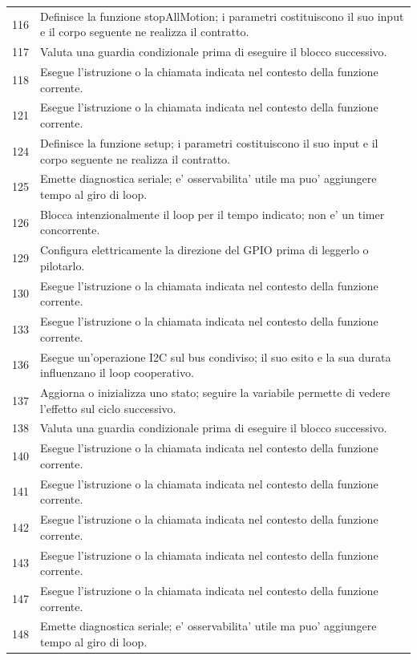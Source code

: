 \documentclass[11pt,a4paper]{article}
\begin{document}
\begin{longtable}{p{}p{}}
116 & Definisce la funzione stopAllMotion; i parametri costituiscono il suo input e il corpo seguente ne realizza il contratto. \\
117 & Valuta una guardia condizionale prima di eseguire il blocco successivo. \\
118 & Esegue l'istruzione o la chiamata indicata nel contesto della funzione corrente. \\
121 & Esegue l'istruzione o la chiamata indicata nel contesto della funzione corrente. \\
124 & Definisce la funzione setup; i parametri costituiscono il suo input e il corpo seguente ne realizza il contratto. \\
125 & Emette diagnostica seriale; e' osservabilita' utile ma puo' aggiungere tempo al giro di loop. \\
126 & Blocca intenzionalmente il loop per il tempo indicato; non e' un timer concorrente. \\
129 & Configura elettricamente la direzione del GPIO prima di leggerlo o pilotarlo. \\
130 & Esegue l'istruzione o la chiamata indicata nel contesto della funzione corrente. \\
133 & Esegue l'istruzione o la chiamata indicata nel contesto della funzione corrente. \\
136 & Esegue un'operazione I2C sul bus condiviso; il suo esito e la sua durata influenzano il loop cooperativo. \\
137 & Aggiorna o inizializza uno stato; seguire la variabile permette di vedere l'effetto sul ciclo successivo. \\
138 & Valuta una guardia condizionale prima di eseguire il blocco successivo. \\
140 & Esegue l'istruzione o la chiamata indicata nel contesto della funzione corrente. \\
141 & Esegue l'istruzione o la chiamata indicata nel contesto della funzione corrente. \\
142 & Esegue l'istruzione o la chiamata indicata nel contesto della funzione corrente. \\
143 & Esegue l'istruzione o la chiamata indicata nel contesto della funzione corrente. \\
147 & Esegue l'istruzione o la chiamata indicata nel contesto della funzione corrente. \\
148 & Emette diagnostica seriale; e' osservabilita' utile ma puo' aggiungere tempo al giro di loop. \\

\end{longtable}
\end{document}

